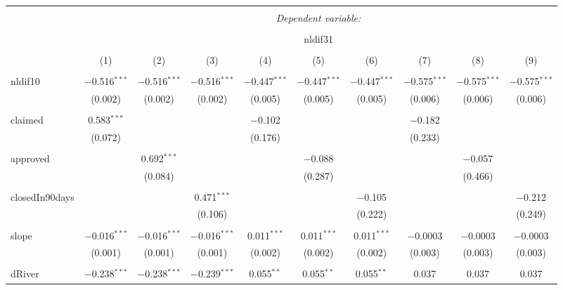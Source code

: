 \documentclass{article}
\begin{document}

\begin{table}[!htbp] \centering 
  \caption{} 
  \label{} 
\begin{tabular}{@{\extracolsep{5pt}}lccccccccc} 
\\[-1.8ex]\hline 
\hline \\[-1.8ex] 
 & \multicolumn{9}{c}{\textit{Dependent variable:}} \\ 
\cline{2-10} 
\\[-1.8ex] & \multicolumn{9}{c}{nldif31} \\ 
\\[-1.8ex] & (1) & (2) & (3) & (4) & (5) & (6) & (7) & (8) & (9)\\ 
\hline \\[-1.8ex] 
 nldif10 & $-$0.516$^{***}$ & $-$0.516$^{***}$ & $-$0.516$^{***}$ & $-$0.447$^{***}$ & $-$0.447$^{***}$ & $-$0.447$^{***}$ & $-$0.575$^{***}$ & $-$0.575$^{***}$ & $-$0.575$^{***}$ \\ 
  & (0.002) & (0.002) & (0.002) & (0.005) & (0.005) & (0.005) & (0.006) & (0.006) & (0.006) \\ 
  & & & & & & & & & \\ 
 claimed & 0.583$^{***}$ &  &  & $-$0.102 &  &  & $-$0.182 &  &  \\ 
  & (0.072) &  &  & (0.176) &  &  & (0.233) &  &  \\ 
  & & & & & & & & & \\ 
 approved &  & 0.692$^{***}$ &  &  & $-$0.088 &  &  & $-$0.057 &  \\ 
  &  & (0.084) &  &  & (0.287) &  &  & (0.466) &  \\ 
  & & & & & & & & & \\ 
 closedIn90days &  &  & 0.471$^{***}$ &  &  & $-$0.105 &  &  & $-$0.212 \\ 
  &  &  & (0.106) &  &  & (0.222) &  &  & (0.249) \\ 
  & & & & & & & & & \\ 
 slope & $-$0.016$^{***}$ & $-$0.016$^{***}$ & $-$0.016$^{***}$ & 0.011$^{***}$ & 0.011$^{***}$ & 0.011$^{***}$ & $-$0.0003 & $-$0.0003 & $-$0.0003 \\ 
  & (0.001) & (0.001) & (0.001) & (0.002) & (0.002) & (0.002) & (0.003) & (0.003) & (0.003) \\ 
  & & & & & & & & & \\ 
 dRiver & $-$0.238$^{***}$ & $-$0.238$^{***}$ & $-$0.239$^{***}$ & 0.055$^{**}$ & 0.055$^{**}$ & 0.055$^{**}$ & 0.037 & 0.037 & 0.037 \\ 

\end{tabular}
\end{table}
\end{document}

